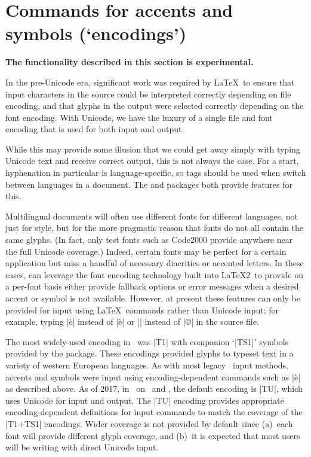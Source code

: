 \documentclass[a4paper]{l3doc}
\begin{document}
\part{Commands for accents and symbols (`encodings')}
\label{part:enc}

\textbf{The functionality described in this section is experimental.}

In the pre-Unicode era, significant work was required by \LaTeX\ to ensure that
input characters in the source could be interpreted correctly depending on file encoding,
and that glyphs in the output were selected correctly depending on the font encoding.
With Unicode, we have the luxury of a single file and font encoding that is used for both input
and output.

While this may provide some illusion that we could get away simply with typing
Unicode text and receive correct output, this is not always the case.
For a start, hyphenation in particular is language-specific, so tags should be used
when switch between languages in a document.
The  and  packages both provide features for this.

Multilingual documents will often use different fonts for different languages,
not just for style, but for the more pragmatic reason that fonts do not all contain
the same glyphs. (In fact, only test fonts such as Code2000 provide
anywhere near the full Unicode coverage.)
Indeed, certain fonts may be perfect for a certain application but miss a handful
of necessary diacritics or accented letters.
In these cases,  can leverage the font encoding technology built
into \LaTeX2\ to provide on a per-font basis either provide fallback options or
error messages when a desired accent or symbol is not available.
However, at present
these features can only be provided for input using \LaTeX\ commands rather
than Unicode input; for example, typing |\`e| instead of |è| or |\textcopyright|
instead of |©| in the source file.

The most widely-used encoding in \LaTeXe\ was |T1| with companion `|TS1|' symbols
provided by the  package.
These encodings provided glyphs to typeset text in a variety of western European languages.
As with most legacy \LaTeXe\ input methods, accents and symbols were input using
encoding-dependent commands such as |\`e| as described above.
As of 2017, in \LaTeXe\ on \XeTeX\ and \LuaTeX, the default encoding is |TU|,
which uses Unicode for input and output.
The |TU| encoding provides appropriate encoding-dependent definitions for input commands
to match the coverage of the |T1+TS1| encodings.
Wider coverage is not provided by default since (a)~each font will provide different glyph coverage, and
(b)~it is expected that most users will be writing with direct Unicode input.
\end{document}
